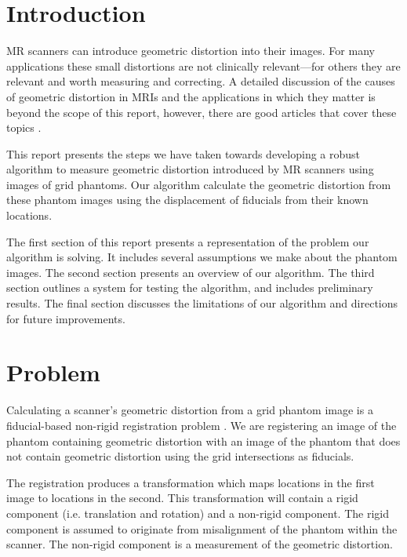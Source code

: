 \documentclass[12pt]{article}
\begin{document}
\maketitle

\section*{Introduction}
MR scanners can introduce geometric distortion into their images.  For many applications these small distortions are not clinically relevant---for others they are relevant and worth measuring and correcting.  A detailed discussion of the causes of geometric distortion in MRIs and the applications in which they matter is beyond the scope of this report, however, there are good articles that cover these topics \cite{baldwin2007,torfeh2015,wang2005,mribook}.  

This report presents the steps we have taken towards developing a robust algorithm to measure geometric distortion introduced by MR scanners using images of grid phantoms.  Our algorithm calculate the geometric distortion from these phantom images using the displacement of fiducials from their known locations.

The first section of this report presents a representation of the problem our algorithm is solving.  It includes several assumptions we make about the phantom images.  The second section presents an overview of our algorithm.  The third section outlines a system for testing the algorithm, and includes preliminary results.  The final section discusses the limitations of our algorithm and directions for future improvements.

\section*{Problem}
Calculating a scanner's geometric distortion from a grid phantom image is a fiducial-based non-rigid registration problem \cite{hill2001}.  We are registering an image of the phantom containing geometric distortion with an image of the phantom that does not contain geometric distortion using the grid intersections as fiducials.

The registration produces a transformation which maps locations in the first image to locations in the second.  This transformation will contain a rigid component (i.e. translation and rotation) and a non-rigid component.  The rigid component is assumed to originate from misalignment of the phantom within the scanner.  The non-rigid component is a measurement of the geometric distortion.
\end{document}

